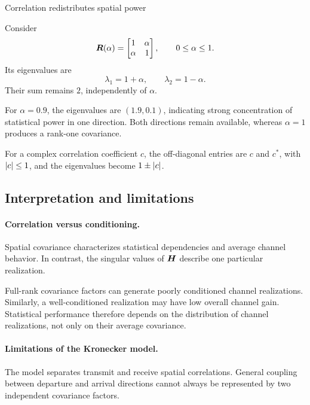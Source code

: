 \begin{example}{Correlation redistributes spatial power}
	\label{ex:corr}
	
	Consider
	\begin{equation}\label{eq:correlation}
		\bm{R}(\alpha)=
		\begin{bmatrix}
			1&\alpha\\
			\alpha&1
		\end{bmatrix},
		\qquad 0\leq\alpha\leq1.
	\end{equation}
	Its eigenvalues are
	\begin{equation*}
		\lambda_1=1+\alpha,\qquad
		\lambda_2=1-\alpha.
	\end{equation*}
	Their sum remains $2$, independently of $\alpha$.
	
	For $\alpha=0.9$, the eigenvalues are
	$(1.9,0.1)$, indicating strong concentration
	of statistical power in one direction.
	Both directions remain available, whereas
	$\alpha=1$ produces a rank-one covariance.
	
	For a complex correlation coefficient $c$,
	the off-diagonal entries are $c$ and $c^*$,
	with $\left|c\right|\leq1$, and the eigenvalues
	become $1\pm\left|c\right|$.
\end{example}


\subsection{Interpretation and limitations}

\paragraph{Correlation versus conditioning.}
Spatial covariance characterizes statistical
dependencies and average channel behavior.
In contrast, the singular values of $\bm{H}$
describe one particular realization.

Full-rank covariance factors can generate
poorly conditioned channel realizations.
Similarly, a well-conditioned realization
may have low overall channel gain.
Statistical performance therefore depends
on the distribution of channel realizations,
not only on their average covariance.

\paragraph{Limitations of the Kronecker model.}
The model separates transmit and receive
spatial correlations. General coupling
between departure and arrival directions
cannot always be represented by two
independent covariance factors.


